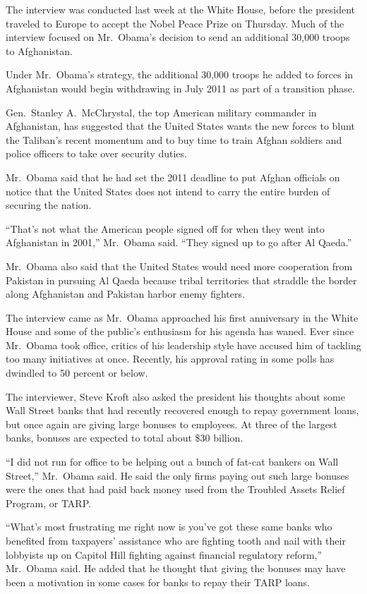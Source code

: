 ﻿\documentclass[12pt]{article}
\begin{document}
The interview was conducted last week at the White House, before the president traveled to Europe to
accept the Nobel Peace Prize on Thursday. Much of the interview focused on Mr.~Obama's decision to
send an additional 30,000 troops to Afghanistan.

Under Mr.~Obama's strategy, the additional 30,000 troops he added to forces in Afghanistan would
begin withdrawing in July 2011 as part of a transition phase.

Gen.~Stanley A.~McChrystal, the top American military commander in Afghanistan, has suggested that
the United States wants the new forces to blunt the Taliban's recent momentum and to buy time to
train Afghan soldiers and police officers to take over security duties.

Mr.~Obama said that he had set the 2011 deadline to put Afghan officials on notice that the United
States does not intend to carry the entire burden of securing the nation.

``That's not what the American people signed off for when they went into Afghanistan in 2001,''
Mr.~Obama said. ``They signed up to go after Al Qaeda.''

Mr.~Obama also said that the United States would need more cooperation from Pakistan in pursuing Al
Qaeda because tribal territories that straddle the border along Afghanistan and Pakistan harbor
enemy fighters.

The interview came as Mr.~Obama approached his first anniversary in the White House and some of the
public's enthusiasm for his agenda has waned. Ever since Mr.~Obama took office, critics of his
leadership style have accused him of tackling too many initiatives at once. Recently, his approval
rating in some polls has dwindled to 50 percent or below.

The interviewer, Steve Kroft also asked the president his thoughts about some Wall Street banks that
had recently recovered enough to repay government loans, but once again are giving large bonuses to
employees. At three of the largest banks, bonuses are expected to total about \$30 billion.

``I did not run for office to be helping out a bunch of fat-cat bankers on Wall Street,'' Mr.~Obama
said. He said the only firms paying out such large bonuses were the ones that had paid back money
used from the Troubled Assets Relief Program, or TARP.

``What's most frustrating me right now is you've got these same banks who benefited from taxpayers'
assistance who are fighting tooth and nail with their lobbyists up on Capitol Hill fighting against
financial regulatory reform,'' Mr.~Obama said. He added that he thought that giving the bonuses may
have been a motivation in some cases for banks to repay their TARP loans.
\end{document}
